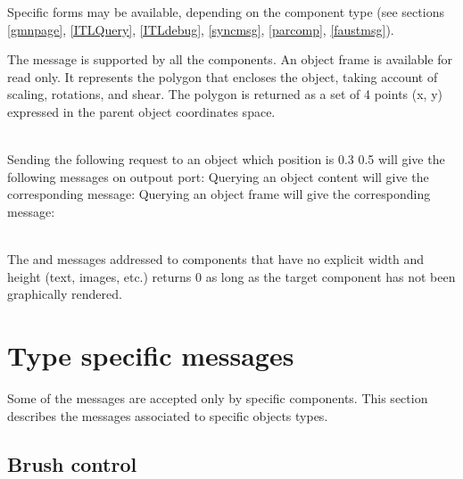 \documentclass[a4paper,twoside]{report}
\newcommand{\toplevel}[1]	{\chapter{#1}}
\newcommand{\sublevel}[1]	{\section{#1}}
\newcommand{\sampleindent}	{ \hspace{0.5cm} }
\begin{document}
Specific  forms may be available, depending on the component type (see sections \ref{gmnpage},  \ref{ITLQuery}, \ref{ITLdebug}, \ref{syncmsg}, \ref{parcomp}, \ref{faustmsg}).

The  message is supported by all the components. An object frame is available for read only. It represents the polygon that encloses the object, taking account of scaling, rotations, and shear. The polygon is returned as a set of 4 points (x, y) expressed in the parent object coordinates space.

\example \\
Sending the following request to an object which position is 0.3 0.5
\sampleindent will give the following messages on outpout port:
Querying an object content
\sampleindent will give the corresponding  message:
Querying an object frame
\sampleindent will give the corresponding  message:


\note{} \\
The  and  messages addressed to components that have no explicit width and height (text, images, etc.) returns 0 as long as the target component has not been graphically rendered.


\toplevel{Type specific messages}
\label{specificMsg}
Some of the messages are accepted only by specific components. This section describes the messages associated to specific objects types.


\sublevel{Brush control}
\label{brush}
\end{document}
